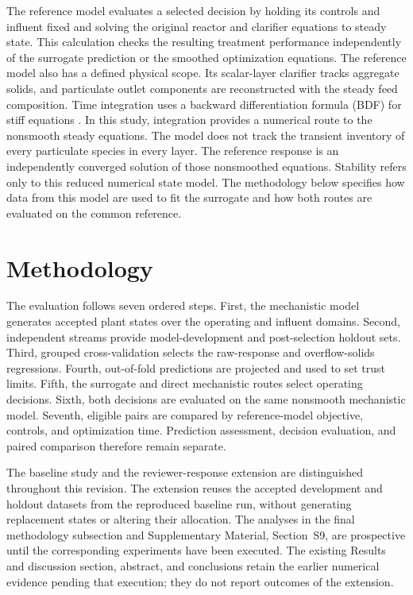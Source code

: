 \documentclass[a4paper,fleqn]{cas-sc}
\begin{document}
The reference model evaluates a selected decision by holding its controls and influent fixed and solving the original reactor and clarifier equations to steady state. This calculation checks the resulting treatment performance independently of the surrogate prediction or the smoothed optimization equations. The reference model also has a defined physical scope. Its scalar-layer clarifier tracks aggregate solids, and particulate outlet components are reconstructed with the steady feed composition. Time integration uses a backward differentiation formula (BDF) for stiff equations \citep{CurtissHirschfelder1952}. In this study, integration provides a numerical route to the nonsmooth steady equations. The model does not track the transient inventory of every particulate species in every layer. The reference response is an independently converged solution of those nonsmoothed equations. Stability refers only to this reduced numerical state model. The methodology below specifies how data from this model are used to fit the surrogate and how both routes are evaluated on the common reference.

\section{Methodology}

The evaluation follows seven ordered steps. First, the mechanistic model generates accepted plant states over the operating and influent domains. Second, independent streams provide model-development and post-selection holdout sets. Third, grouped cross-validation selects the raw-response and overflow-solids regressions. Fourth, out-of-fold predictions are projected and used to set trust limits. Fifth, the surrogate and direct mechanistic routes select operating decisions. Sixth, both decisions are evaluated on the same nonsmooth mechanistic model. Seventh, eligible pairs are compared by reference-model objective, controls, and optimization time. Prediction assessment, decision evaluation, and paired comparison therefore remain separate.

The baseline study and the reviewer-response extension are distinguished throughout this revision. The extension reuses the accepted development and holdout datasets from the reproduced baseline run, without generating replacement states or altering their allocation. The analyses in the final methodology subsection and Supplementary Material, Section~S9, are prospective until the corresponding experiments have been executed. The existing Results and discussion section, abstract, and conclusions retain the earlier numerical evidence pending that execution; they do not report outcomes of the extension.
\end{document}
